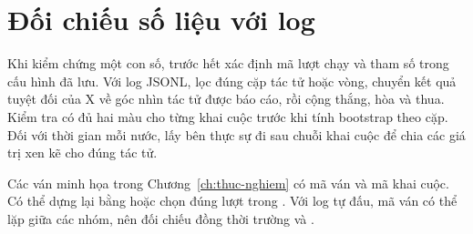 \section{Đối chiếu số liệu với log}
Khi kiểm chứng một con số, trước hết xác định mã lượt chạy và tham số trong cấu hình đã lưu.
Với log JSONL, lọc đúng cặp tác tử hoặc vòng, chuyển kết quả tuyệt đối của X về góc nhìn
tác tử được báo cáo, rồi cộng thắng, hòa và thua. Kiểm tra có đủ hai màu cho từng khai cuộc
trước khi tính bootstrap theo cặp. Đối với thời gian mỗi nước, lấy bên thực sự đi sau chuỗi
khai cuộc để chia các giá trị xen kẽ cho đúng tác tử.

Các ván minh họa trong Chương~\ref{ch:thuc-nghiem} có mã ván và mã khai cuộc.
Có thể dựng lại bằng  hoặc chọn đúng lượt trong
. Với log tự đấu, mã ván có thể lặp giữa các nhóm,
nên đối chiếu đồng thời trường  và .
